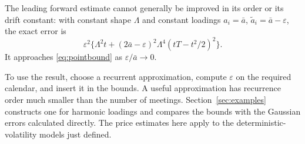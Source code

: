 The leading forward estimate cannot generally be improved in its order or its drift constant: with constant shape $\Lambda$ and constant loadings $a_i=\bar a$, $\widetilde a_i=\bar a-\varepsilon$, the exact error is
\[
\varepsilon^2\{\Lambda^2t+(2\bar a-\varepsilon)^2\Lambda^4(tT-t^2/2)^2\}.
\]
It approaches \eqref{eq:pointbound} as $\varepsilon/\bar a\to0$.

To use the result, choose a recurrent approximation, compute $\varepsilon$ on the required calendar, and insert it in the bounds. A useful approximation has recurrence order much smaller than the number of meetings. Section~\ref{sec:examples} constructs one for harmonic loadings and compares the bounds with the Gaussian errors calculated directly. The price estimates here apply to the deterministic-volatility models just defined.
